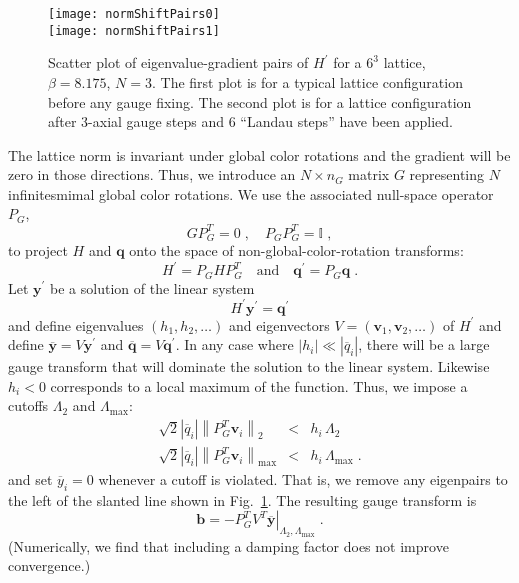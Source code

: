 \documentclass[preprint,aps,prd]{revtex4-2}
\newcommand{\be}{\begin{equation}}
\newcommand{\eq}{\end{equation}}
\newcommand{\heigen}{h}
\begin{document}
\begin{figure}
\texttt{[image: normShiftPairs0]}\\
\texttt{[image: normShiftPairs1]}
\caption{Scatter plot of eigenvalue-gradient pairs of $H^\prime$
  for a $6^3$ lattice, $\beta = 8.175$, $N=3$.
  The first plot is for a typical lattice configuration before any
  gauge fixing.  The second plot is for a lattice configuration
  after 3-axial gauge steps and 6 ``Landau steps'' have been
  applied.
  \label{normShiftPairs}}
\end{figure}

The lattice norm is invariant under global color rotations and
the gradient will be zero in those directions.
Thus, we introduce an $N\times n_G$ matrix $G$
representing $N$ infinitesmimal global color rotations.
We use the associated null-space operator $P_G$,
\be
G P_G^T = 0 \;, \quad P_G P_G^T = \mathbb{I} \; ,
\eq
to project $H$ and $\mathbf{q}$ onto
the space of non-global-color-rotation transforms:
\be
         H^\prime = P_G H P_G^T \quad \mbox{and} \quad
         \mathbf{q}^\prime = P_G \mathbf{q} \; .
\eq
%
Let $\mathbf{y}^\prime$ be a solution of the linear system
\be
   H^\prime \mathbf{y}^\prime = \mathbf{q}^\prime \label{normlinear2}
\eq
and define eigenvalues
$\left(\heigen_1, \heigen_2, \ldots\right)$ and
eigenvectors $V=\left(\mathbf{v}_1, \mathbf{v}_2, \ldots\right)$
of $H^\prime$ and
define $\overline{\mathbf{y}} = V \mathbf{y}^\prime$ and
$\overline{\mathbf{q}}  = V \mathbf{q}^\prime$.
 In any case where $\left|\heigen_i\right|\ll
\left|\overline{q}_i\right|$,
there will be a large gauge transform that will dominate the solution
to the linear system.
Likewise $\heigen_i<0$ corresponds to a local maximum of the function.
Thus, we impose a cutoffs $\Lambda_2$ and $\Lambda_\mathrm{max}$:
\begin{eqnarray}
    \sqrt{2} \left|\overline{q}_i\right|\left\lVert P_G^T \mathbf{v}_i\right\rVert_2
     &<& \heigen_i \, \Lambda_2 \label{normlambda2}\\
    \sqrt{2} \left|\overline{q}_i\right|
      \left\lVert P_G^T \mathbf{v}_i\right\rVert_\mathrm{max}
    &<& \heigen_i\, \Lambda_\mathrm{max} \; .
\end{eqnarray}
%
and set $\overline{y}_i=0$ whenever a cutoff is violated.
That is, we remove any eigenpairs to the left
of the slanted line shown in Fig.~\ref{normShiftPairs}.
The resulting gauge transform is
\be
      \mathbf{b} = -P_G^T \left. V^T
                    \overline{\mathbf{y}}\right|_{\Lambda_2,\Lambda_\mathrm{max}} \; .
\eq
%
(Numerically, we find that including a damping factor does not
improve convergence.)
\end{document}
